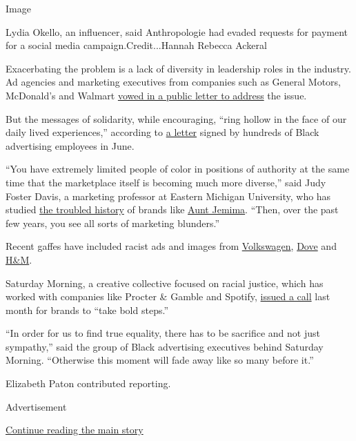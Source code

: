 Image

Lydia Okello, an influencer, said Anthropologie had evaded requests for
payment for a social media campaign.Credit...Hannah Rebecca Ackeral

Exacerbating the problem is a lack of diversity in leadership roles in
the industry. Ad agencies and marketing executives from companies such
as General Motors, McDonald's and Walmart
\href{https://www.anaaimm.net/campaigns/commitment-to-systemic-change-letter}{vowed
in a public letter to address} the issue.

But the messages of solidarity, while encouraging, ``ring hollow in the
face of our daily lived experiences,'' according to
\href{https://docs.google.com/document/d/1yVH9y0geSyJmpqUH2utaK7x1Salq5CE5IIkx0HHCGuM/preview?pru=AAABcr356cw*LhF4-mllXS4dVdIVEszy9Q}{a
letter} signed by hundreds of Black advertising employees in June.

``You have extremely limited people of color in positions of authority
at the same time that the marketplace itself is becoming much more
diverse,'' said Judy Foster Davis, a marketing professor at Eastern
Michigan University, who has studied
\href{https://www.nytimes.com/2020/06/17/business/aunt-jemima-racial-stereotype.html}{the
troubled history} of brands like
\href{https://journals.sagepub.com/doi/10.1177/0276146706296709}{Aunt
Jemima}. ``Then, over the past few years, you see all sorts of marketing
blunders.''

Recent gaffes have included racist ads and images from
\href{https://www.nytimes.com/2020/05/21/business/volkswagen-ad.html}{Volkswagen},
\href{https://twitter.com/Dove/status/916731793927278592}{Dove} and
\href{https://www.nytimes.com/2018/03/29/business/fast-fashion-diversity.html}{H\&M}.

Saturday Morning, a creative collective focused on racial justice, which
has worked with companies like Procter \& Gamble and Spotify,
\href{https://www.saturdaymorning.co/}{issued a call} last month for
brands to ``take bold steps.''

``In order for us to find true equality, there has to be sacrifice and
not just sympathy,'' said the group of Black advertising executives
behind Saturday Morning. ``Otherwise this moment will fade away like so
many before it.''

Elizabeth Paton contributed reporting.

Advertisement

\protect\hyperlink{after-bottom}{Continue reading the main story}

